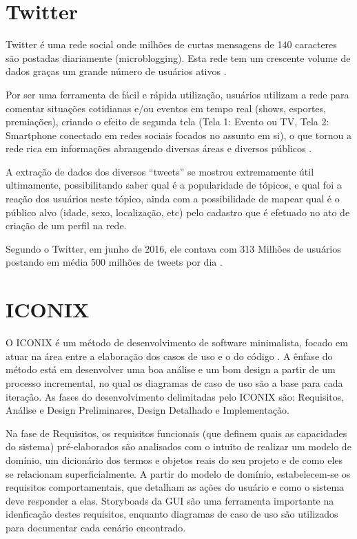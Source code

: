 \documentclass[
	12pt,				%
	openright,			%
	oneside,			%
	a4paper,			%
	english,			%
	spanish,			%
	brazil				%
	]{abntex2}
\begin{document}
	\section{Twitter}
	
	Twitter é uma rede social onde milhões de curtas mensagens de 140 caracteres são postadas diariamente (microblogging). Esta rede tem um crescente volume de dados graças um grande número de usuários ativos \cite{conference_twitter_alg}.

	Por ser uma ferramenta de fácil e rápida utilização, usuários utilizam a rede para comentar situações cotidianas e/ou eventos em tempo real (shows, esportes, premiações), criando o efeito de segunda tela (Tela 1: Evento ou TV, Tela 2: Smartphone conectado em redes sociais focados no assunto em si), o que tornou a rede rica em informações abrangendo diversas áreas e diversos públicos \cite{conference_twitter_sports}.

	A extração de dados dos diversos “tweets” se mostrou extremamente útil ultimamente, possibilitando saber qual é a popularidade de tópicos, e qual foi a reação dos usuários neste tópico,  ainda com a possibilidade de mapear qual é o público alvo (idade, sexo, localização, etc) pelo cadastro que é efetuado no ato de criação de um perfil na rede.

	Segundo o Twitter, em junho de 2016, ele contava com 313 Milhões de usuários \cite{twitter_company} postando em média 500 milhões de tweets por dia \cite{TwitterU87:online}.
	
	\section{ICONIX}	
	
	O ICONIX é um método de desenvolvimento de software minimalista, focado em atuar na área entre a elaboração dos casos de uso e o do código \cite{iconix}. A ênfase do método está em desenvolver uma boa análise e um bom design a partir de um processo incremental, no qual os diagramas de caso de uso são a base para cada iteração. As fases do desenvolvimento delimitadas pelo ICONIX são: Requisitos, Análise e Design Preliminares, Design Detalhado e Implementação.
	
	Na fase de Requisitos, os requisitos funcionais (que definem quais as capacidades do sistema) pré-elaborados são analisados com o intuito de realizar um modelo de domínio, um dicionário dos termos e objetos reais do seu projeto e de como eles se relacionam superficialmente. A partir do modelo de domínio, estabelecem-se os requisitos comportamentais, que detalham as ações do usuário e como o sistema deve responder a elas. \cite{iconix} Storyboads da GUI são uma ferramenta importante na idenficação destes requisitos, enquanto diagramas de caso de uso são utilizados para documentar cada cenário encontrado.
	
\end{document}
